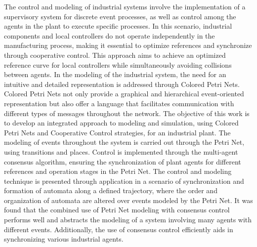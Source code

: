 The control and modeling of industrial systems involve the implementation of a supervisory system for discrete event processes, as well as control among the agents in the plant to execute specific processes. In this scenario, industrial components and local controllers do not operate independently in the manufacturing process, making it essential to optimize references and synchronize through cooperative control. This approach aims to achieve an optimized reference curve for local controllers while simultaneously avoiding collisions between agents. In the modeling of the industrial system, the need for an intuitive and detailed representation is addressed through Colored Petri Nets. Colored Petri Nets not only provide a graphical and hierarchical event-oriented representation but also offer a language that facilitates communication with different types of messages throughout the network.
The objective of this work is to develop an integrated approach to modeling and simulation, using Colored Petri Nets and Cooperative Control strategies, for an industrial plant.
The modeling of events throughout the system is carried out through the Petri Net, using transitions and places. Control is implemented through the multi-agent consensus algorithm, ensuring the synchronization of plant agents for different references and operation stages in the Petri Net.
The control and modeling technique is presented through application in a scenario of synchronization and formation of automata along a defined trajectory, where the order and organization of automata are altered over events modeled by the Petri Net.
It was found that the combined use of Petri Net modeling with consensus control performs well and abstracts the modeling of a system involving many agents with different events. Additionally, the use of consensus control efficiently aids in synchronizing various industrial agents.

